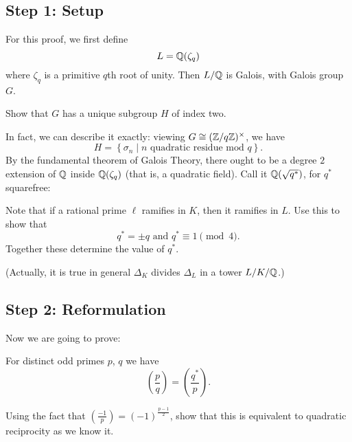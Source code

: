 \subsection{Step 1: Setup}
For this proof, we first define
\[ L = \mathbb Q(\zeta_q) \]
where $\zeta_q$ is a primitive $q$th root of unity.
Then $L/\mathbb Q$ is Galois, with Galois group $G$.
\begin{ques}
	Show that $G$ has a unique subgroup $H$ of index two.
\end{ques}
In fact, we can describe it exactly: viewing $G \cong (\mathbb Z/q\mathbb Z)^\times$, we have
\[ H = \left\{ \sigma_n \mid \text{$n$ quadratic residue mod $q$} \right\}. \]
By the fundamental theorem of Galois Theory, there ought to be a degree $2$
extension of $\mathbb Q$ inside $\mathbb Q(\zeta_q)$ (that is, a quadratic field).
Call it $\mathbb Q(\sqrt{q^\ast})$, for $q^\ast$ squarefree:
\begin{center}
\end{center}
\begin{exercise}
	Note that if a rational prime $\ell$ ramifies in $K$,
	then it ramifies in $L$.
	Use this to show that
	\[ q^\ast = \pm q \text{ and } q^\ast \equiv 1 \pmod 4. \]
	Together these determine the value of $q^\ast$.
\end{exercise}
(Actually, it is true in general 
$\Delta_K$ divides $\Delta_L$ in a tower $L/K/\mathbb Q$.)

\subsection{Step 2: Reformulation}
Now we are going to prove:
\begin{theorem}
	For distinct odd primes $p$, $q$ we have
	\[ \left( \frac pq \right) = \left( \frac{q^\ast}{p} \right). \]
\end{theorem}
\begin{exercise}
	Using the fact that $\left( \frac{-1}{p} \right) = (-1)^{\frac{p-1}{2}}$,
	show that this is equivalent to quadratic reciprocity as we know it.
\end{exercise}

